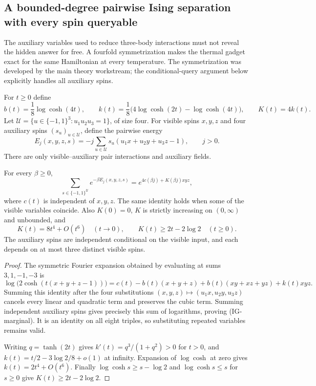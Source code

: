 \subsection{A bounded-degree pairwise Ising separation with every spin queryable}
\label{res:pairwise}

The auxiliary variables used to reduce three-body interactions must
not reveal the hidden answer for free. A fourfold symmetrization makes
the thermal gadget exact for the same Hamiltonian at every temperature.
The symmetrization was developed by the main theory workstream; the
conditional-query argument below explicitly handles all auxiliary spins.

For $t\ge0$ define
\[
 b(t)=\frac18\log\cosh(4t),\qquad
 k(t)=\frac18\bigl(4\log\cosh(2t)-\log\cosh(4t)\bigr),
 \qquad K(t)=4k(t).
\]
Let $\mathcal U=\{u\in\{-1,1\}^3:u_1u_2u_3=1\}$, of size four.
For visible spins $x,y,z$ and four auxiliary spins $(s_u)_{u\in\mathcal U}$,
define the pairwise energy
\[
 E_j(x,y,z,s)=-j\sum_{u\in\mathcal U}s_u(u_1x+u_2y+u_3z-1),
 \qquad j>0.
 \tag{IG}
\]
There are only visible--auxiliary pair interactions and auxiliary fields.

\begin{lemma}
\label{res:gadget}
For every $\beta\ge0$,
\[
 \sum_{s\in\{-1,1\}^{\mathcal U}}e^{-\beta E_j(x,y,z,s)}
 =e^{4c(\beta j)+K(\beta j)xyz},
 \tag{IG-marginal}
\]
where $c(t)$ is independent of $x,y,z$. The same identity holds when
some of the visible variables coincide. Also $K(0)=0$, $K$ is strictly
increasing on $(0,\infty)$ and unbounded, and
\[
 K(t)=8t^4+O(t^6)\quad(t\to0),\qquad
 K(t)\ge2t-2\log2\quad(t\ge0).
\]
The auxiliary spins are independent conditional on the visible input,
and each depends on at most three distinct visible spins.
\end{lemma}

\begin{proof}
The symmetric Fourier expansion obtained by evaluating at sums
$3,1,-1,-3$ is
\[
 \log\bigl(2\cosh(t(x+y+z-1))\bigr)
 =c(t)-b(t)(x+y+z)+b(t)(xy+xz+yz)+k(t)xyz.
\]
Summing this identity after the four substitutions
$(x,y,z)\mapsto(u_1x,u_2y,u_3z)$ cancels every linear and quadratic
term and preserves the cubic term. Summing independent auxiliary
spins gives precisely this sum of logarithms, proving (IG-marginal).
It is an identity on all eight triples, so substituting repeated
variables remains valid.

Writing $q=\tanh(2t)$ gives
$k'(t)=q^3/(1+q^2)>0$ for $t>0$, and
$k(t)=t/2-3\log2/8+o(1)$ at infinity. Expansion of $\log\cosh$
at zero gives $k(t)=2t^4+O(t^6)$. Finally
$\log\cosh s\ge s-\log2$ and $\log\cosh s\le s$ for $s\ge0$
give $K(t)\ge2t-2\log2$.
\end{proof}

